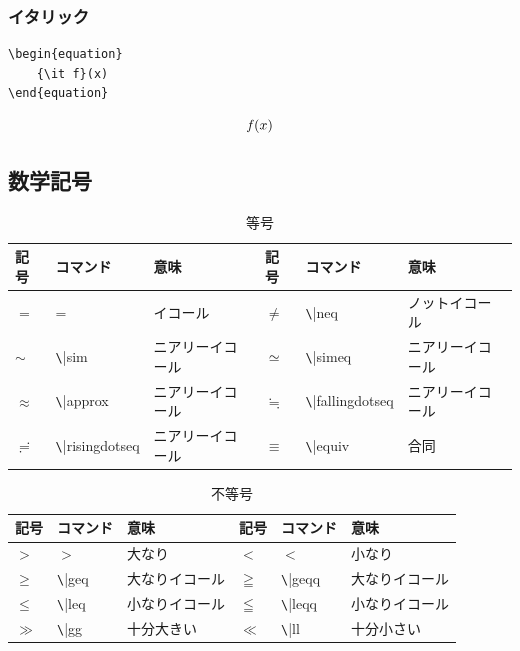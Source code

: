 \documentclass[11pt,a4paper]{jsarticle}
\begin{document}
\subsubsection{イタリック}

\begin{lstlisting}
\begin{equation}
	{\it f}(x)
\end{equation}
\end{lstlisting}

\begin{equation}
	{\it f}(x)
\end{equation}


\subsection{数学記号}

\begin{table} [ h ]
\caption{等号}
	\begin{center}
	\begin{tabular}{| l | l | l || l | l | l |} \hline
		記号 & コマンド & 意味 & 記号 & コマンド & 意味 \\ \hline
		$=$ & = & イコール & $\neq$ & \verb|\|neq & ノットイコール \\ \hline
		$\sim$ & \verb|\|sim & ニアリーイコール & $\simeq$ & \verb|\|simeq & ニアリーイコール \\ \hline
		$\approx$ & \verb|\|approx & ニアリーイコール & $\fallingdotseq$ & \verb|\|fallingdotseq & ニアリーイコール \\ \hline
		$\risingdotseq$ & \verb|\|risingdotseq & ニアリーイコール & $\equiv$ & \verb|\|equiv & 合同 \\ \hline
	\end{tabular}
	\end{center}
\end{table}

\begin{table} [ h ]
\caption{不等号}
	\begin{center}
	\begin{tabular}{| l | l | l || l | l | l |} \hline
		記号 & コマンド & 意味 & 記号 & コマンド & 意味 \\ \hline
		$>$ & $>$ & 大なり & $<$ & $<$ & 小なり \\ \hline
		$\geq$ & \verb|\|geq & 大なりイコール & $\geqq $ & \verb|\|geqq & 大なりイコール \\ \hline
		$\leq$ & \verb|\|leq & 小なりイコール & $\leqq $ & \verb|\|leqq & 小なりイコール \\ \hline
		$\gg$ & \verb|\|gg & 十分大きい & $\ll$ & \verb|\|ll & 十分小さい \\ \hline
	\end{tabular}
	\end{center}
\end{table}
\end{document}
